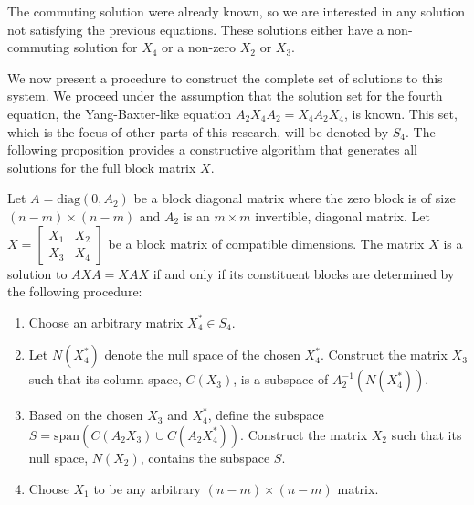 \documentclass{article}
\begin{document}
The commuting solution were already known, so we are interested in any solution not satisfying the previous equations.
These solutions either have a non-commuting solution for $X_4$ or a non-zero $X_2$ or $X_3$.

We now present a procedure to construct the complete set of solutions to this system.
We proceed under the assumption that the solution set for the fourth equation, the Yang-Baxter-like equation $A_2 X_4 A_2 = X_4 A_2 X_4$, is known.
This set, which is the focus of other parts of this research, will be denoted by $S_4$.
The following proposition provides a constructive algorithm that generates all solutions for the full block matrix $X$.

\begin{theorem} \label{prop:constructive_solution}
Let $A = \text{diag}(0, A_2)$ be a block diagonal matrix where the zero block is of size $(n - m) \times (n - m)$ and $A_2$ is an $m \times m$ invertible, diagonal matrix.
  Let $X = \begin{bmatrix} X_1 & X_2\\ X_3 & X_4 \end{bmatrix}$ be a block matrix of compatible dimensions.
  The matrix $X$ is a solution to $AXA = XAX$ if and only if its constituent blocks are determined by the following procedure:
  \begin{enumerate}
    \item Choose an arbitrary matrix $X_4^* \in S_4$.
    \item Let $N(X_4^*)$ denote the null space of the chosen $X_4^*$.
      Construct the matrix $X_3$ such that its column space, $C(X_3)$, is a subspace of $A_2^{-1}(N(X_4^*))$.
    \item Based on the chosen $X_3$ and $X_4^*$, define the subspace $S = \text{span}(C(A_2 X_3) \cup C(A_2 X_4^*))$.
      Construct the matrix $X_2$ such that its null space, $N(X_2)$, contains the subspace $S$.
    \item Choose $X_1$ to be any arbitrary $(n - m) \times (n - m)$ matrix.
  \end{enumerate}
\end{theorem}
\end{document}
